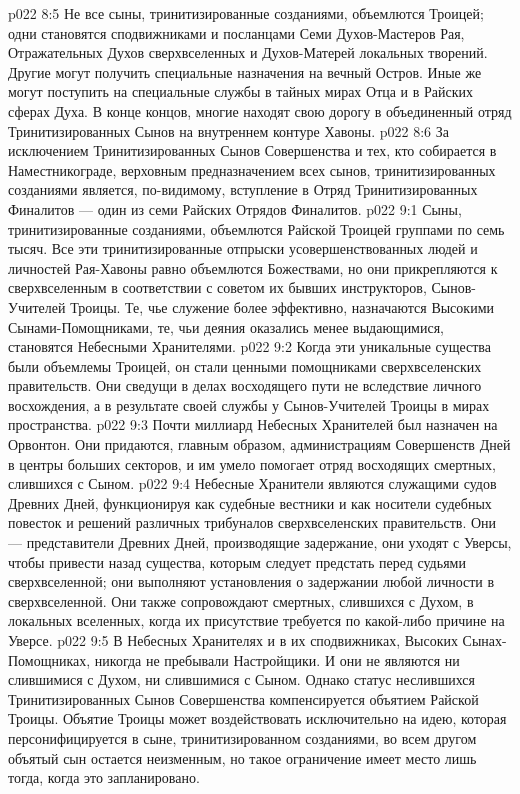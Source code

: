 \vs p022 8:5 Не все сыны, тринитизированные созданиями, объемлются Троицей; одни становятся сподвижниками и посланцами Семи Духов\hyp{}Мастеров Рая, Отражательных Духов сверхвселенных и Духов\hyp{}Матерей локальных творений. Другие могут получить специальные назначения на вечный Остров. Иные же могут поступить на специальные службы в тайных мирах Отца и в Райских сферах Духа. В конце концов, многие находят свою дорогу в объединенный отряд Тринитизированных Сынов на внутреннем контуре Хавоны.
\vs p022 8:6 За исключением Тринитизированных Сынов Совершенства и тех, кто собирается в Наместникограде, верховным предназначением всех сынов, тринитизированных созданиями является, по\hyp{}видимому, вступление в Отряд Тринитизированных Финалитов --- один из семи Райских Отрядов Финалитов.
\vs p022 9:1 Сыны, тринитизированные созданиями, объемлются Райской Троицей группами по семь тысяч. Все эти тринитизированные отпрыски усовершенствованных людей и личностей Рая\hyp{}Хавоны равно объемлются Божествами, но они прикрепляются к сверхвселенным в соответствии с советом их бывших инструкторов, Сынов\hyp{}Учителей Троицы. Те, чье служение более эффективно, назначаются Высокими Сынами\hyp{}Помощниками, те, чьи деяния оказались менее выдающимися, становятся Небесными Хранителями.
\vs p022 9:2 Когда эти уникальные существа были объемлемы Троицей, он стали ценными помощниками сверхвселенских правительств. Они сведущи в делах восходящего пути не вследствие личного восхождения, а в результате своей службы у Сынов\hyp{}Учителей Троицы в мирах пространства.
\vs p022 9:3 \pc Почти миллиард Небесных Хранителей был назначен на Орвонтон. Они придаются, главным образом, администрациям Совершенств Дней в центры больших секторов, и им умело помогает отряд восходящих смертных, слившихся с Сыном.
\vs p022 9:4 Небесные Хранители являются служащими судов Древних Дней, функционируя как судебные вестники и как носители судебных повесток и решений различных трибуналов сверхвселенских правительств. Они --- представители Древних Дней, производящие задержание, они уходят с Уверсы, чтобы привести назад существа, которым следует предстать перед судьями сверхвселенной; они выполняют установления о задержании любой личности в сверхвселенной. Они также сопровождают смертных, слившихся с Духом, в локальных вселенных, когда их присутствие требуется по какой\hyp{}либо причине на Уверсе.
\vs p022 9:5 \pc В Небесных Хранителях и в их сподвижниках, Высоких Сынах\hyp{}Помощниках, никогда не пребывали Настройщики. И они не являются ни слившимися с Духом, ни слившимися с Сыном. Однако статус неслившихся Тринитизированных Сынов Совершенства компенсируется объятием Райской Троицы. Объятие Троицы может воздействовать исключительно на идею, которая персонифицируется в сыне, тринитизированном созданиями, во всем другом объятый сын остается неизменным, но такое ограничение имеет место лишь тогда, когда это запланировано.
